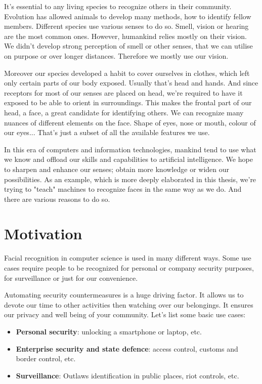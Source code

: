 It's essential to any living species to recognize others in their community. Evolution has allowed animals to develop many methods, how to identify fellow members. Different species use various senses to do so. Smell, vision or hearing are the most common ones. However, humankind relies mostly on their vision. We didn't develop strong perception of smell or other senses, that we can utilise on purpose or over longer distances. Therefore we mostly use our vision.

Moreover our species developed a habit to cover ourselves in clothes, which left only certain parts of our body exposed. Usually that's head and hands. And since receptors for most of our senses are placed on head, we're required to have it exposed to be able to orient in surroundings. This makes the frontal part of our head, a face, a great candidate for identifying others. We can recognize many nuances of different elements on the face. Shape of eyes, nose or mouth, colour of our eyes... That's just a subset of all the available features we use.

In this era of computers and information technologies, mankind tend to use what we know and offload our skills and capabilities to artificial intelligence. We hope to sharpen and enhance our senses; obtain more knowledge or widen our possibilities. As an example, which is more deeply elaborated in this thesis, we're trying to "teach" machines to recognize faces in the same way as we do. And there are various reasons to do so.

\section{Motivation}
Facial recognition in computer science is used in many different ways. Some use cases require people to be recognized for personal or company security purposes, for surveillance or just for our convenience.

Automating security countermeasures is a huge driving factor. It allows us to devote our time to other activities then watching over our belongings. It ensures our privacy and well being of your community. Let's list some basic use cases:

\begin{itemize}
    \item \textbf{Personal security}: unlocking a smartphone or laptop, etc.
    \item \textbf{Enterprise security and state defence}: access control, customs and border control, etc.
    \item \textbf{Surveillance}: Outlaws identification in public places, riot controls, etc.
\end{itemize}

